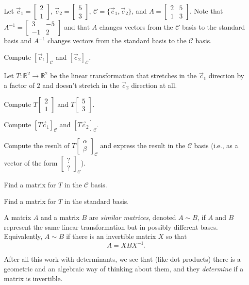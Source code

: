 \documentclass[14pt]{problemset}
\newcommand{\R}{\mathbb{R}}
\newcommand{\mat}[1]{\begin{bmatrix}#1\end{bmatrix}}
\begin{document}
	\question
	Let $\vec c_1=\mat{2\\1}$, $\vec c_2=\mat{5\\3}$, $\mathcal C=\{\vec c_1,\vec c_2\}$, and $A=\mat{2&5\\1&3}$.
	Note that $A^{-1}=\mat{3&-5\\-1&2}$ and that $A$ changes vectors from the $\mathcal C$ basis to the standard
	basis and $A^{-1}$ changes vectors from the standard basis to the $\mathcal C$ basis.
	\begin{parts}
		\item Compute $[\vec c_1]_{\mathcal C}$ and $[\vec c_2]_{\mathcal C}$.
	\end{parts}
	Let $T:\R^2\to\R^2$ be the linear transformation that stretches in the $\vec c_1$ direction by a factor of $2$
	and doesn't stretch in the $\vec c_2$ direction at all.
	\begin{parts}[resume]
		\item Compute $T\mat{2\\1}$ and $T\mat{5\\3}$.
		\item Compute $[T\vec c_1]_{\mathcal C}$ and $[T\vec c_2]_{\mathcal C}$.
		\item Compute the result of $T\mat{\alpha\\\beta}_{\mathcal C}$ and express the result in the
			$\mathcal C$ basis (i.e., as a vector of the form $\mat{?\\?}_{\mathcal C}$).
		\item Find a matrix for $T$ in the $\mathcal C$ basis.
		\item Find a matrix for $T$ in the standard basis.
	\end{parts}
	\begin{definition}
		A matrix $A$ and a matrix $B$ are \emph{similar matrices}, denoted $A\sim B$, if
		$A$ and $B$ represent the same linear transformation but in possibly different bases.
		Equivalently, $A\sim B$ if there is an invertible matrix $X$ so that
		\[
			A=XBX^{-1}.
		\]
	\end{definition}




	After all this work with determinants, we see 
	that (like dot products) there is a geometric and an
	algebraic way of thinking about them, and they 
	\emph{determine} if a matrix is invertible.
\end{document}
